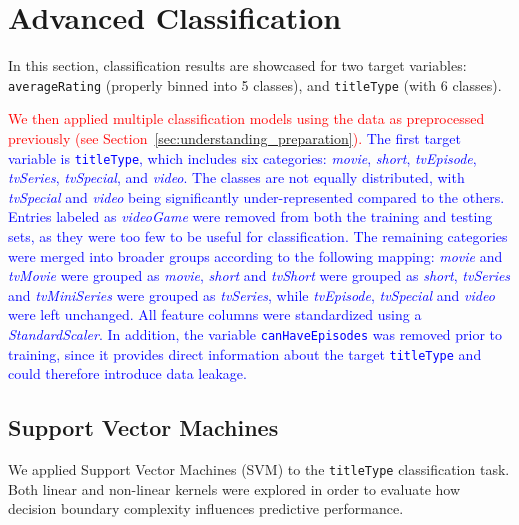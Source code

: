 \section{Advanced Classification}
\label{sec:advanced_classification}

In this section, classification results are showcased for two
target variables: \texttt{averageRating} (properly binned into
5 classes), and \texttt{titleType} (with 6 classes).

\textcolor{red}{We then applied multiple classification models using the data as preprocessed previously (see Section~\ref{sec:understanding_preparation}).}   
\textcolor{blue}{The first target variable is \texttt{titleType}, which includes six categories: 
\textit{movie}, \textit{short}, \textit{tvEpisode}, \textit{tvSeries}, 
\textit{tvSpecial}, and \textit{video}. 
The classes are not equally distributed, with \textit{tvSpecial} and \textit{video} 
being significantly under-represented compared to the others. Entries labeled as \textit{videoGame} were removed from both the training and testing sets, 
as they were too few to be useful for classification. 
The remaining categories were merged into broader groups according to the following mapping: 
\textit{movie} and \textit{tvMovie} were grouped as \textit{movie}, 
\textit{short} and \textit{tvShort} were grouped as \textit{short}, 
\textit{tvSeries} and \textit{tvMiniSeries} were grouped as \textit{tvSeries}, 
while \textit{tvEpisode}, \textit{tvSpecial} and \textit{video} were left unchanged. 
All feature columns were standardized using a \textit{StandardScaler}. 
In addition, the variable \texttt{canHaveEpisodes} was removed prior to training, 
since it provides direct information about the target \texttt{titleType} 
and could therefore introduce data leakage.}

\subsection{Support Vector Machines}
\label{subsec:svm}


We applied Support Vector Machines (SVM) to the \texttt{titleType} classification task.
Both linear and non-linear kernels were explored in order to evaluate how decision boundary complexity influences predictive performance.

